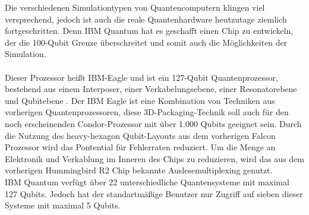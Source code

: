 Die verschiedenen Simulationtypen von Quantencomputern klingen viel versprechend, jedoch ist auch die reale Quantenhardware heutzutage ziemlich fortgeschritten. Denn IBM Quantum hat es geschafft einen Chip zu entwickeln, der die 100-Qubit Grenze \"uberschreitet und somit auch die M\"oglichkeiten der Simulation. \\\\
Dieser Prozessor hei\ss t IBM-Eagle und ist ein 127-Qubit Quantenprozessor, bestehend aus einem Interposer, einer Verkabelungsebene, einer Resonatorebene und Qubitebene \cite{IBM-Eagle}. Der IBM Eagle ist eine Kombination von Techniken aus vorherigen Quantenprozessoren, diese 3D-Packaging-Technik soll auch f\"ur den noch erscheinenden Condor-Prozessor mit \"uber 1.000 Qubits geeignet sein. Durch die Nutzung des heavy-hexagon Qubit-Layouts \cite{heavy-hex} aus dem vorherigen Falcon Prozessor wird das Pontential f\"ur Fehlerraten reduziert. Um die Menge an Elektronik und Verkablung im Inneren des Chips zu reduzieren, wird das aus dem vorherigen Hummingbird R2 Chip bekannte Auslesemultiplexing genutzt.\\
IBM Quantum verf\"ugt \"uber 22 unterschiedliche Quantensysteme mit maximal 127 Qubits. Jedoch hat der standartm\"a\ss ige Benutzer nur Zugriff auf sieben dieser Systeme mit maximal 5 Qubits.

